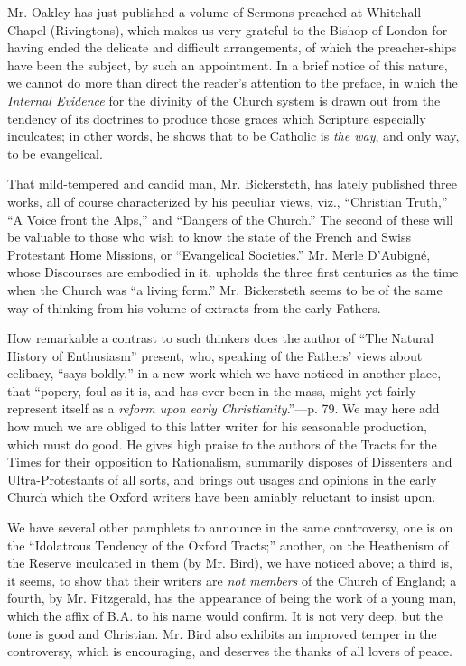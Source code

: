 Mr. Oakley has just published a volume of Sermons
preached at Whitehall Chapel (Rivingtons), which makes us very grateful
to the Bishop of London for having ended the delicate and difficult
arrangements, of which the preacher-ships have been the subject, by such
an appointment. In a brief notice of this nature, we cannot do more than
direct the reader's attention to the preface, in which the \emph{Internal
Evidence} for the divinity of the Church system is drawn out from the
tendency of its doctrines to produce those graces which Scripture
especially inculcates; in other words, he shows that to be Catholic is \emph{the
way}, and only way, to be evangelical.

That mild-tempered and candid man, Mr. Bickersteth,
has lately published three works, all of course characterized by his
peculiar views, viz., ``Christian Truth,'' ``A Voice front the Alps,'' and ``Dangers
of the Church.'' The second of these will be valuable to those who wish
to know the state of the French and Swiss Protestant Home Missions, or ``Evangelical
Societies.'' Mr. Merle D'Aubigné, whose Discourses are embodied in it,
upholds the three first centuries as the time when the Church was ``a
living form.'' Mr. Bickersteth seems to be of the same way of thinking
from his volume of extracts from the early Fathers.

How remarkable a contrast to such thinkers does the
author of ``The Natural History of Enthusiasm'' present, who,
speaking of the Fathers' views about celibacy, ``says boldly,'' in a new
work which we have noticed in another place, that ``popery, foul as it
is, and has ever been in the mass, might yet fairly represent itself as
a \emph{reform upon early Christianity}.''—p. 79. We may here add how
much we are obliged to this latter writer for his seasonable production,
which must do good. He gives high praise to the authors of the Tracts
for the Times for their opposition to Rationalism, summarily disposes of
Dissenters and Ultra-Protestants of all sorts, and brings out usages and
opinions in the early Church which the Oxford writers have been amiably
reluctant to insist upon.

We have several other pamphlets to announce in the
same controversy, one is on the ``Idolatrous Tendency of the Oxford
Tracts;'' another, on the Heathenism of the Reserve inculcated in them
(by Mr. Bird), we have noticed above; a third is, it seems, to show that
their writers are \emph{not members} of the Church of England; a fourth,
by Mr. Fitzgerald, has the appearance of being the work of a young man,
which the affix of B.A. to his name would confirm. It is not very deep,
but the tone is good and Christian. Mr. Bird also exhibits an improved
temper in the controversy, which is encouraging, and deserves the thanks
of all lovers of peace.

